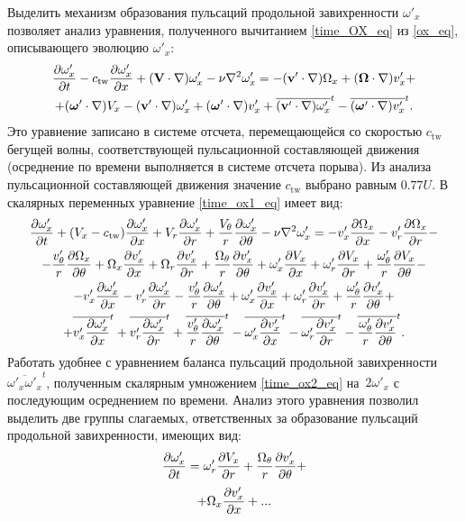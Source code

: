 Выделить механизм образования пульсаций продольной завихренности $\omega'_x$ позволяет анализ уравнения, полученного вычитанием \eqref{time_OX_eq} из \eqref{ox_eq}, описывающего эволюцию $\omega'_x$:
\begin{multline}\label{time_ox1_eq}
\frac{\partial \omega'_x}{\partial t} - c_\mathrm{tw}\frac{\partial \omega'_x}{\partial x} + (\mathbf{V} \cdot \nabla) \omega'_x - \nu \nabla^2 \omega'_x = - (\mathbf{v}' \cdot \nabla) \Omega_x +(\mbox{\boldmath$\Omega$} \cdot \nabla) v'_x + \\ + (\mbox{\boldmath$\omega$}' \cdot \nabla) V_x - (\mathbf{v}' \cdot \nabla) \omega'_x  + (\mbox{\boldmath$\omega$}' \cdot \nabla) v'_x  + \overline{(\mathbf{v}' \cdot \nabla) \omega'_x}^t  - \overline{(\mbox{\boldmath$\omega$}' \cdot \nabla)v'_x}^t.
\end{multline}
Это уравнение записано в системе отсчета, перемещающейся со скоростью $c_\mathrm{tw}$ бегущей волны, соответствующей пульсационной составляющей движения (осреднение по времени выполняется в системе отсчета порыва). Из анализа пульсационной составляющей движения значение $c_\mathrm{tw}$ выбрано равным $0.77U$. 
В скалярных переменных уравнение \eqref{time_ox1_eq} имеет вид:
\begin{multline}\label{time_ox2_eq}
\frac{\partial \omega'_x}{\partial t} + (V_x - c_\mathrm{tw})\frac{\partial \omega'_x}{\partial x} + V_r \frac{\partial \omega_x'}{\partial r} + \frac{V_\theta}{r} \frac{\partial \omega'_x}{\partial \theta} 
- \nu\nabla^2\omega'_x = - v'_x \frac{\partial \Omega_x}{\partial x} - v'_r \frac{\partial \Omega_x}{\partial r} - \\ - \frac{v'_\theta}{r} \frac{\partial \Omega_x}{\partial \theta} 
+ \Omega_x \frac{\partial v'_x}{\partial x} + \Omega_r \frac{\partial v'_x}{\partial r} + \frac{\Omega_\theta}{r} \frac{\partial v'_x}{\partial \theta}
+ \omega'_x \frac{\partial V_x}{\partial x} + \omega'_r \frac{\partial V_x}{\partial r} + \frac{\omega'_\theta}{r} \frac{\partial V_x}{\partial \theta} - \\ 
- v'_x \frac{\partial \omega'_x}{\partial x} - v'_r \frac{\partial \omega'_x}{\partial r} - \frac{v'_\theta}{r} \frac{\partial \omega'_x}{\partial \theta} 
+ \omega'_x \frac{\partial v'_x}{\partial x} + \omega'_r \frac{\partial v'_x}{\partial r} + \frac{\omega'_\theta}{r} \frac{\partial v'_x}{\partial \theta} + \\
+ \overline{v'_x \frac{\partial \omega'_x}{\partial x}}^t + \overline{v'_r \frac{\partial \omega'_x}{\partial r}}^t + \overline{\frac{v'_\theta}{r} \frac{\partial \omega'_x}{\partial \theta}}^t
- \overline{\omega'_x \frac{\partial v'_x}{\partial x}}^t - \overline{\omega'_r \frac{\partial v'_x}{\partial r}}^t - \overline{\frac{\omega'_\theta}{r} \frac{\partial v'_x}{\partial \theta}}^t.
\end{multline}
Работать удобнее с уравнением баланса пульсаций продольной завихренности $\overline{\omega'_x \omega'_x}^t$, полученным скалярным умножением \eqref{time_ox2_eq} на~$2 \omega'_x$ с последующим осреднением по времени. Анализ этого уравнения позволил выделить две группы слагаемых, ответственных за образование пульсаций продольной завихренности, имеющих вид:
\begin{equation}\label{time_ox1gen_terms1}
\frac{\partial \omega'_x}{\partial t} = \omega'_r \frac {\partial V_x}{\partial r} + \frac{\Omega_\theta}{r} \frac{\partial v'_x}{\partial \theta} + 
\end{equation}
\begin{equation}\label{time_ox1gen_term2}
+\Omega_x \frac {\partial v'_x}{\partial x} + ...
\end{equation}


